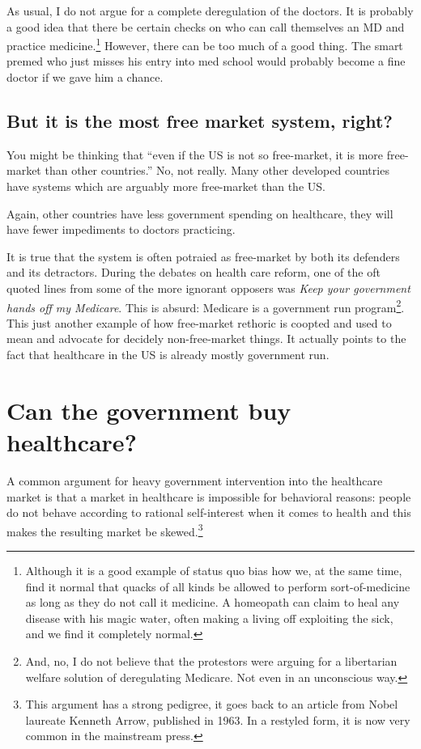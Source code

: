 As usual, I do not argue for a complete deregulation of the doctors. It is
probably a good idea that there be certain checks on who can call themselves an
MD and practice medicine.\footnote{Although it is a good example of status quo
bias how we, at the same time, find it normal that quacks of all kinds be
allowed to perform sort-of-medicine as long as they do not call it medicine. A
homeopath can claim to heal any disease with his magic water, often making a
living off exploiting the sick, and we find it completely normal.} However,
there can be too much of a good thing. The smart premed who just misses his
entry into med school would probably become a fine doctor if we gave him a
chance.

\subsection{But it is the most free market system, right?}

You might be thinking that ``even if the US is not so free-market, it is more
free-market than other countries.'' No, not really. Many other developed
countries have systems which are arguably more free-market than the US.

Again, other countries have less government spending on healthcare, they will
have fewer impediments to doctors practicing.

It is true that the system is often potraied as free-market by both its
defenders and its detractors. During the debates on health care reform, one of
the oft quoted lines from some of the more ignorant opposers was \emph{Keep
your government hands off my Medicare}. This is absurd: Medicare is a
government run program\footnote{And, no, I do not believe that the protestors
were arguing for a libertarian welfare solution of deregulating Medicare. Not
even in an unconscious way.}. This just another example of how free-market
rethoric is coopted and used to mean and advocate for decidely non-free-market
things. It actually points to the fact that healthcare in the US is already
mostly government run.

\section{Can the government buy healthcare?}

A common argument for heavy government intervention into the healthcare market
is that a market in healthcare is impossible for behavioral reasons: people do
not behave according to rational self-interest when it comes to health and this
makes the resulting market be skewed.\footnote{This argument has a strong
pedigree, it goes back to an article from Nobel laureate Kenneth Arrow,
published in 1963. In a restyled form, it is now very common in the mainstream
press.}

